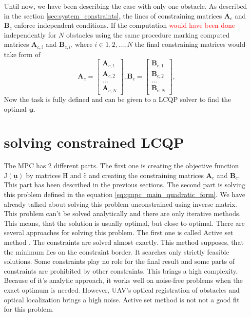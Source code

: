 \documentclass{article}
\begin{document}
Until now, we have been describing the case with only one obstacle. As described in the section \ref{sec:system_constraints}, the lines of constraining matrices $\textbf{A}_c$ and $\textbf{B}_c$  enforce independent conditions. If the computation \textcolor{red}{would have been done} independently for $N$ obstacles using the same procedure marking computed matrices $\textbf{A}_{c,i}$ and $\textbf{B}_{c,i}$, where $i \in {1, 2, ..., N}$ the final constraining matrices would take form of
\begin{equation}
\textbf{A}_c =
  \begin{bmatrix}
  \textbf{A}_{c,1} \\
  \textbf{A}_{c,2} \\
  ...	   \\
  \textbf{A}_{c,N}
  \end{bmatrix},\textbf{B}_c = \begin{bmatrix}
  \textbf{B}_{c,1} \\
  \textbf{B}_{c,2} \\
  ...	   \\
  \textbf{B}_{c,N}
  \end{bmatrix}, 
\end{equation}
Now the task is fully defined and can be given to a LCQP solver to find the optimal $\underline{\textbf{u}}$. 

\section{solving constrained LCQP}
The MPC has 2 different parts. The first one is creating the objective function $\mathrm{J}(\underline{\textbf{u}})$ by matrices $\textbf{\^H}$ and $\textbf{\^c}$ and creating the constraining matrices $\textbf{A}_c$ and $\textbf{B}_c$. This part has been described in the previous sections. The second part is solving this problem defined in the equation \ref{eq:qmpc_main_quadratic_form}. We have already talked about solving this problem unconstrained using inverse matrix. This problem can't be solved analytically and there are only iterative methods. This means, that the solution is usually optimal, but close to optimal. There are several approaches for solving this problem.
The first one is called Active set method \cite{schittkowski1983convergence}. The constraints are solved almost exactly. This method supposes, that the minimum lies on the constraint border. It searches only strictly feasible solutions. Some constraints play no role for the final result and some parts of constraints are prohibited by other constraints. This brings a high complexity. Because of it's analytic approach, it works well on noise-free problems when the exact optimum is needed. However, UAV's optical registration of obstacles and optical localization brings a high noise. Active set method is not not a good fit for this problem.
\end{document}
